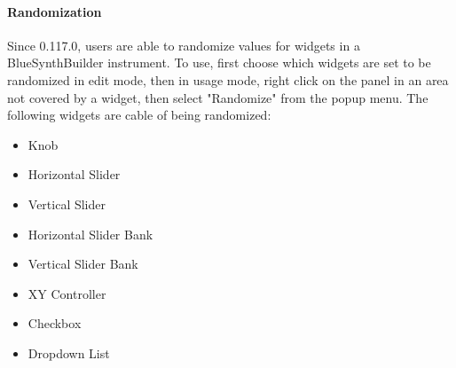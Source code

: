 \paragraph{Randomization}\label{bsbWidgetRandomization}

Since 0.117.0, users are able to randomize values for widgets in a
BlueSynthBuilder instrument. To use, first choose which widgets are set
to be randomized in edit mode, then in usage mode, right click on the
panel in an area not covered by a widget, then select "Randomize" from
the popup menu. The following widgets are cable of being randomized:

\begin{itemize}
\item
  Knob
\item
  Horizontal Slider
\item
  Vertical Slider
\item
  Horizontal Slider Bank
\item
  Vertical Slider Bank
\item
  XY Controller
\item
  Checkbox
\item
  Dropdown List
\end{itemize}
